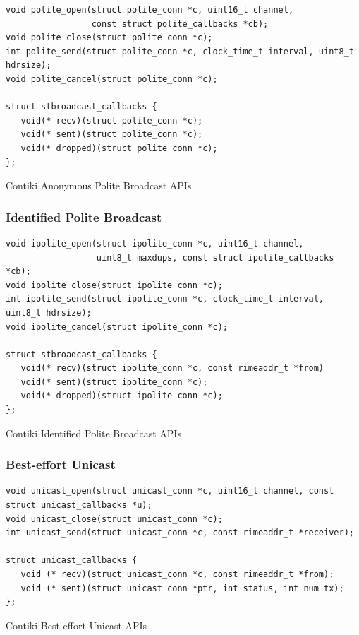 \begin{listing}[H]
\begin{verbatim}
void polite_open(struct polite_conn *c, uint16_t channel,
                 const struct polite_callbacks *cb);
void polite_close(struct polite_conn *c);
int polite_send(struct polite_conn *c, clock_time_t interval, uint8_t hdrsize);
void polite_cancel(struct polite_conn *c);

struct stbroadcast_callbacks {
   void(* recv)(struct polite_conn *c);
   void(* sent)(struct polite_conn *c);
   void(* dropped)(struct polite_conn *c);
};
\end{verbatim}
\caption{Contiki Anonymous Polite Broadcast APIs}
\end{listing}

\subsubsection{Identified Polite Broadcast}

\begin{listing}[H]
\begin{verbatim}
void ipolite_open(struct ipolite_conn *c, uint16_t channel,
                  uint8_t maxdups, const struct ipolite_callbacks *cb);
void ipolite_close(struct ipolite_conn *c);
int ipolite_send(struct ipolite_conn *c, clock_time_t interval, uint8_t hdrsize);
void ipolite_cancel(struct ipolite_conn *c);

struct stbroadcast_callbacks {
   void(* recv)(struct ipolite_conn *c, const rimeaddr_t *from)
   void(* sent)(struct ipolite_conn *c);
   void(* dropped)(struct ipolite_conn *c);
};
\end{verbatim}
\caption{Contiki Identified Polite Broadcast APIs}
\end{listing}

\subsubsection{Best-effort Unicast}

\begin{listing}[H]
\begin{verbatim}
void unicast_open(struct unicast_conn *c, uint16_t channel, const struct unicast_callbacks *u);
void unicast_close(struct unicast_conn *c);
int unicast_send(struct unicast_conn *c, const rimeaddr_t *receiver);

struct unicast_callbacks {
   void (* recv)(struct unicast_conn *c, const rimeaddr_t *from);
   void (* sent)(struct unicast_conn *ptr, int status, int num_tx);
};
\end{verbatim}
\caption{Contiki Best-effort Unicast APIs}
\end{listing}

